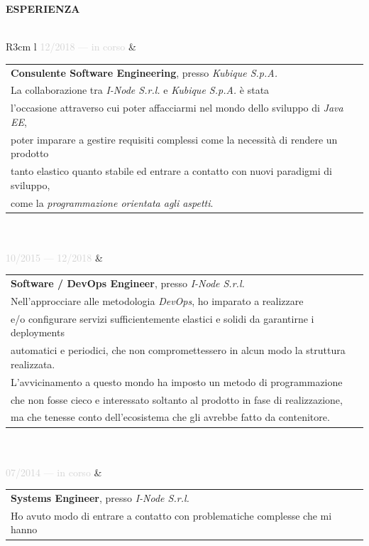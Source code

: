 \documentclass{article}
\begin{document}
\textbf{\textcolor{deepblue}{ESPERIENZA}} \\\\ \hfill
\begin{tabular}{ R{3cm} l }
	\textcolor{lightgray}{12/2018 — in corso} & \begin{tabular}[l]{@{}l@{}}
		\textbf{Consulente Software Engineering}, presso \textit{Kubique S.p.A.} \\
		La collaborazione tra \textit{I-Node S.r.l.} e \textit{Kubique S.p.A.} è stata \\
		l'occasione attraverso cui poter affacciarmi nel mondo dello sviluppo di \textit{Java EE}, \\
		poter imparare a gestire requisiti complessi come la necessità di rendere un prodotto \\
		tanto elastico quanto stabile ed entrare a contatto con nuovi paradigmi di sviluppo, \\
		come la \textit{programmazione orientata agli aspetti}.
	\end{tabular} \\\\ \hfill
	\textcolor{lightgray}{10/2015 — 12/2018} & \begin{tabular}[l]{@{}l@{}}
		\textbf{Software / DevOps Engineer}, presso \textit{I-Node S.r.l.} \\
		Nell'approcciare alle metodologia \textit{DevOps}, ho imparato a realizzare \\
		e/o configurare servizi sufficientemente elastici e solidi da garantirne i deployments \\
		automatici e periodici, che non compromettessero in alcun modo la struttura realizzata. \\
		L'avvicinamento a questo mondo ha imposto un metodo di programmazione \\
		che non fosse cieco e interessato soltanto al prodotto in fase di realizzazione, \\
		ma che tenesse conto dell'ecosistema che gli avrebbe fatto da contenitore.
	\end{tabular} \\\\ \hfill
	\textcolor{lightgray}{07/2014 — in corso}   & \begin{tabular}[l]{@{}l@{}}
		\textbf{Systems Engineer}, presso \textit{I-Node S.r.l.} \\
		Ho avuto modo di entrare a contatto con problematiche complesse che mi hanno \\

\end{tabular}
\end{tabular}
\end{document}
